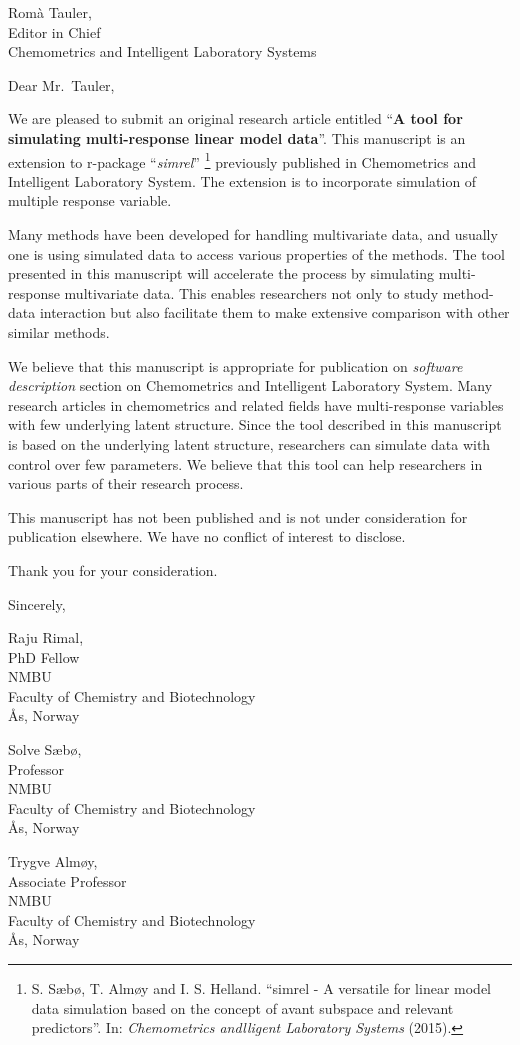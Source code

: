 \documentclass[11pt,a4paper,]{letter}
\date{July 25, 2017}
\begin{document}
\begin{letter}{Romà Tauler,\\Editor in Chief\\Chemometrics and Intelligent Laboratory Systems}
\opening{Dear Mr.~Tauler,}

We are pleased to submit an original research article entitled
``\textbf{A tool for simulating multi-response linear model data}''.
This manuscript is an extension to r-package ``\emph{simrel}''
\footnote{S. Sæbø, T. Almøy and I. S. Helland. ``simrel - A versatile
  for linear model data simulation based on the concept of avant
  subspace and relevant predictors''. In: \emph{Chemometrics andlligent
  Laboratory Systems} (2015).} previously published in Chemometrics and
Intelligent Laboratory System. The extension is to incorporate
simulation of multiple response variable.

Many methods have been developed for handling multivariate data, and
usually one is using simulated data to access various properties of the
methods. The tool presented in this manuscript will accelerate the
process by simulating multi-response multivariate data. This enables
researchers not only to study method-data interaction but also
facilitate them to make extensive comparison with other similar methods.

We believe that this manuscript is appropriate for publication on
\emph{software description} section on Chemometrics and Intelligent
Laboratory System. Many research articles in chemometrics and related
fields have multi-response variables with few underlying latent
structure. Since the tool described in this manuscript is based on the
underlying latent structure, researchers can simulate data with control
over few parameters. We believe that this tool can help researchers in
various parts of their research process.

This manuscript has not been published and is not under consideration
for publication elsewhere. We have no conflict of interest to disclose.

Thank you for your consideration.

\longindentation=0pt
\closing{Sincerely,}
 \parbox[b]{0.3\textwidth}{Raju Rimal,\\PhD Fellow\\NMBU\\Faculty of Chemistry and Biotechnology\\\AA s, Norway}\hfill \parbox[b]{0.3\textwidth}{Solve S\ae b\o,\\Professor\\NMBU\\Faculty of Chemistry and Biotechnology\\\AA s, Norway}\hfill \parbox[b]{0.3\textwidth}{Trygve Alm\o y,\\Associate Professor\\NMBU\\Faculty of Chemistry and Biotechnology\\\AA s, Norway}

\end{letter}
\end{document}
